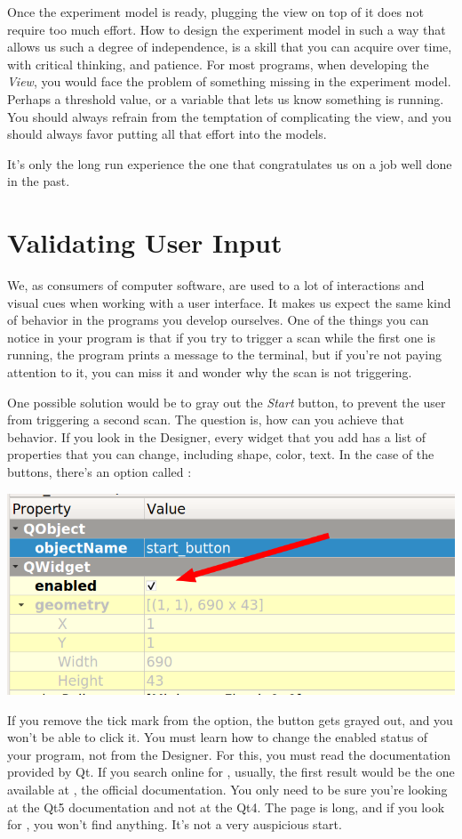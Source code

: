 Once the experiment model is ready, plugging the view on top of it does not require too much effort. How to design the experiment model in such a way that allows us such a degree of independence, is a skill that you can acquire over time, with critical thinking, and patience. For most programs, when developing the \emph{View}, you would face the problem of something missing in the experiment model. Perhaps a threshold value, or a variable that lets us know something is running. You should always refrain from the temptation of complicating the view, and you should always favor putting all that effort into the models.

It's only the long run experience the one that congratulates us on a job well done in the past.

\section{Validating User Input}\label{sec:validating-user-input}
We, as consumers of computer software, are used to a lot of interactions and visual cues when working with a user interface. It makes us expect the same kind of behavior in the programs you develop ourselves. One of the things you can notice in your program is that if you try to trigger a scan while the first one is running, the program prints a message to the terminal, but if you're not paying attention to it, you can miss it and wonder why the scan is not triggering.

One possible solution would be to gray out the \emph{Start} button, to prevent the user from triggering a second scan. The question is, how can you achieve that behavior. If you look in the Designer, every widget that you add has a list of properties that you can change, including shape, color, text. In the case of the buttons, there's an option called :

\begin{center}
    \includegraphics[width=.4\linewidth]{images/Chapter_09/10_enabled_button.png}
\end{center}

If you remove the tick mark from the option, the button gets grayed out, and you won't be able to click it. You must learn how to change the enabled status of your program, not from the Designer. For this, you must read the documentation provided by Qt. If you search online for , usually, the first result would be the one available at , the official documentation. You only need to be sure you're looking at the Qt5 documentation and not at the Qt4. The page is long, and if you look for , you won't find anything. It's not a very auspicious start.

